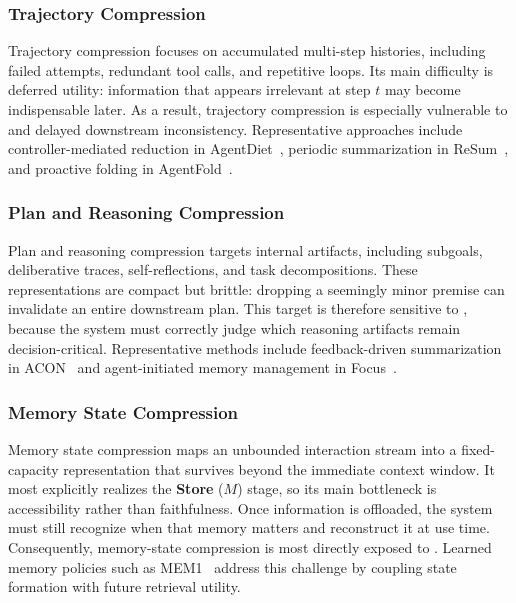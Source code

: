 \subsubsection{Trajectory Compression}
Trajectory compression focuses on accumulated multi-step histories, including failed attempts, redundant tool calls, and repetitive loops. Its main difficulty is deferred utility: information that appears irrelevant at step $t$ may become indispensable later. As a result, trajectory compression is especially vulnerable to \ftwo \quad and delayed downstream inconsistency. Representative approaches include controller-mediated reduction in AgentDiet~\citep{xiao2025improving}, periodic summarization in ReSum~\citep{wu2026resumunlockinglonghorizonsearch}, and proactive folding in AgentFold~\citep{ye2025agentfoldlonghorizonwebagents}.

\subsubsection{Plan and Reasoning Compression}
Plan and reasoning compression targets internal artifacts, including subgoals, deliberative traces, self-reflections, and task decompositions. These representations are compact but brittle: dropping a seemingly minor premise can invalidate an entire downstream plan. This target is therefore  sensitive to \fone, because the system must correctly judge which reasoning artifacts remain decision-critical. Representative methods include feedback-driven summarization in ACON~\citep{kang2025aconoptimizingcontextcompression} and agent-initiated memory management in Focus~\citep{verma2026activecontextcompressionautonomous}.


\subsubsection{Memory State Compression}
Memory state compression maps an unbounded interaction stream into a fixed-capacity representation that survives beyond the immediate context window. It most explicitly realizes the \textbf{Store} ($M$) stage, so its main bottleneck is accessibility rather than faithfulness. Once information is offloaded, the system must still recognize when that memory matters and reconstruct it at use time. Consequently, memory-state compression is most directly exposed to \fthree. Learned memory policies such as MEM1~\citep{zhou2025mem1learningsynergizememory} address this challenge by coupling state formation with future retrieval utility.

